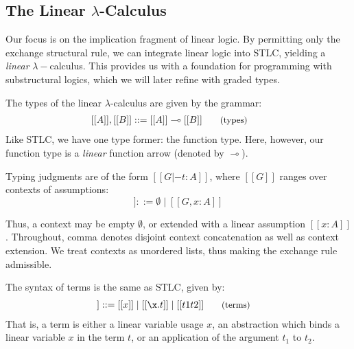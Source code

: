 \subsection{The Linear $\lambda$-Calculus}
\label{sec:linear-lambda-calc}
Our focus is on the implication fragment of linear logic. By permitting only the
exchange structural rule, we can integrate linear logic into STLC, yielding a
\emph{linear} $\lambda-$calculus. This provides us with a foundation for
programming with substructural logics, which we will later refine with graded
types. 

The types of the linear $\lambda$-calculus are given by the grammar: 
\begin{align*}
  \hspace{-0.9em}[[ A ]] , [[ B ]] & ::=
         [[ A ]] \multimap [[ B ]]
  {\small{\tag{types}}}
\end{align*}
Like STLC, we have one type former: the function type. Here, however, our function type
is a \emph{linear} function arrow (denoted by $\multimap$).



Typing judgments are of the form $[[ G |- t : A ]]$, where $[[ G ]]$ ranges over
contexts of assumptions:
\begin{equation*}
  [[ G ]] ::= \emptyset
  \mid [[ G , x : A ]]
\tag{contexts}
\end{equation*}

Thus, a context may be empty $\emptyset$, or extended with a linear assumption $[[
x : A ]]$. Throughout, comma denotes disjoint context concatenation as well as 
context extension. We treat contexts as unordered lists, thus making the exchange 
rule admissible. 

The syntax of terms is the same as STLC, given by:
\begin{align*}
  [[ t ]] ::= \;
         & [[ x ]]
    \mid [[ \x . t ]]
    \mid [[ t1 t2 ]]
  {\small{\tag{terms}}}
\end{align*}
That is, a term is either a linear variable usage $x$, an abstraction which binds a
linear variable $x$ in the term $t$, or an application of the argument $t_1$ to $t_2$. 

